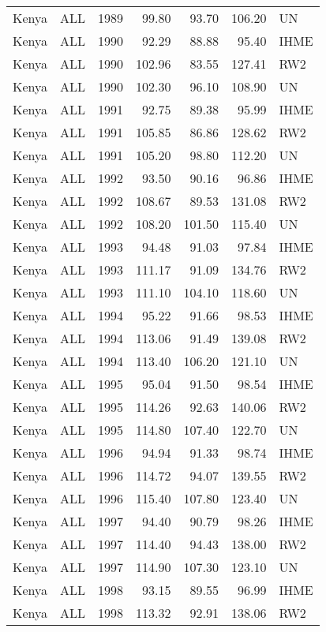 \begin{longtable}{lllrrrl}
  Kenya & ALL & 1989 & 99.80 & 93.70 & 106.20 & UN \\ 
  Kenya & ALL & 1990 & 92.29 & 88.88 & 95.40 & IHME \\ 
  Kenya & ALL & 1990 & 102.96 & 83.55 & 127.41 & RW2 \\ 
  Kenya & ALL & 1990 & 102.30 & 96.10 & 108.90 & UN \\ 
  Kenya & ALL & 1991 & 92.75 & 89.38 & 95.99 & IHME \\ 
  Kenya & ALL & 1991 & 105.85 & 86.86 & 128.62 & RW2 \\ 
  Kenya & ALL & 1991 & 105.20 & 98.80 & 112.20 & UN \\ 
  Kenya & ALL & 1992 & 93.50 & 90.16 & 96.86 & IHME \\ 
  Kenya & ALL & 1992 & 108.67 & 89.53 & 131.08 & RW2 \\ 
  Kenya & ALL & 1992 & 108.20 & 101.50 & 115.40 & UN \\ 
  Kenya & ALL & 1993 & 94.48 & 91.03 & 97.84 & IHME \\ 
  Kenya & ALL & 1993 & 111.17 & 91.09 & 134.76 & RW2 \\ 
  Kenya & ALL & 1993 & 111.10 & 104.10 & 118.60 & UN \\ 
  Kenya & ALL & 1994 & 95.22 & 91.66 & 98.53 & IHME \\ 
  Kenya & ALL & 1994 & 113.06 & 91.49 & 139.08 & RW2 \\ 
  Kenya & ALL & 1994 & 113.40 & 106.20 & 121.10 & UN \\ 
  Kenya & ALL & 1995 & 95.04 & 91.50 & 98.54 & IHME \\ 
  Kenya & ALL & 1995 & 114.26 & 92.63 & 140.06 & RW2 \\ 
  Kenya & ALL & 1995 & 114.80 & 107.40 & 122.70 & UN \\ 
  Kenya & ALL & 1996 & 94.94 & 91.33 & 98.74 & IHME \\ 
  Kenya & ALL & 1996 & 114.72 & 94.07 & 139.55 & RW2 \\ 
  Kenya & ALL & 1996 & 115.40 & 107.80 & 123.40 & UN \\ 
  Kenya & ALL & 1997 & 94.40 & 90.79 & 98.26 & IHME \\ 
  Kenya & ALL & 1997 & 114.40 & 94.43 & 138.00 & RW2 \\ 
  Kenya & ALL & 1997 & 114.90 & 107.30 & 123.10 & UN \\ 
  Kenya & ALL & 1998 & 93.15 & 89.55 & 96.99 & IHME \\ 
  Kenya & ALL & 1998 & 113.32 & 92.91 & 138.06 & RW2 \\ 

\end{longtable}
